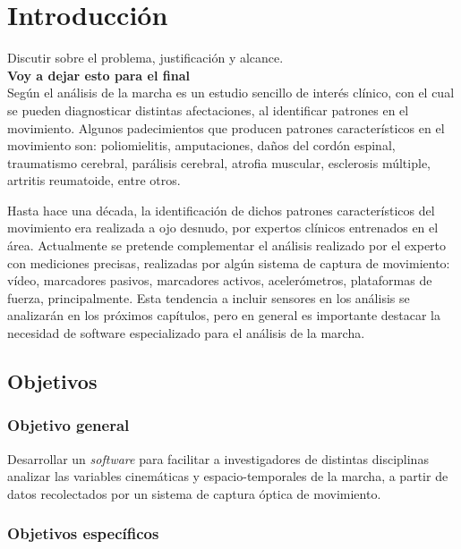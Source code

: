 \chapter{Introducción}

Discutir sobre el problema, justificación y alcance. \\
\textbf{Voy a dejar esto para el final}\\
Según \cite{perry} el análisis de la marcha es un estudio sencillo de interés clínico, con el cual se pueden diagnosticar distintas afectaciones, al identificar patrones en el movimiento. Algunos padecimientos que producen patrones característicos en el movimiento son: poliomielitis, amputaciones, daños del cordón espinal, traumatismo cerebral, parálisis cerebral, atrofia muscular, esclerosis múltiple, artritis reumatoide, entre otros. 

Hasta hace una década, la identificación de dichos patrones característicos del movimiento era realizada a ojo desnudo, por expertos clínicos entrenados en el área. Actualmente se pretende complementar el análisis realizado por el experto con mediciones precisas, realizadas por algún sistema de captura de movimiento: vídeo, marcadores pasivos, marcadores activos, acelerómetros, plataformas de fuerza, principalmente. Esta tendencia a incluir sensores en los análisis se analizarán en los próximos capítulos, pero en general es importante destacar la necesidad de software especializado para el análisis de la marcha. 


\section{Objetivos}

\subsection{Objetivo general}

Desarrollar un \emph{software} para facilitar a investigadores de distintas disciplinas analizar las variables cinemáticas y espacio-temporales de la marcha, a partir de datos recolectados por un sistema de captura óptica de movimiento.

\subsection{Objetivos específicos}

